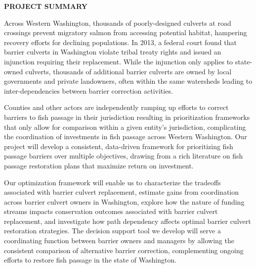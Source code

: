 \begin{center} \textbf{PROJECT SUMMARY} \end{center}




			Across Western Washington, thousands of poorly-designed culverts at road crossings prevent migratory salmon from accessing potential habitat, hampering recovery efforts for declining populations. In 2013, a federal court found that barrier culverts in Washington violate tribal treaty rights and issued an injunction requiring their replacement. While the injunction only applies to state-owned culverts, thousands of additional barrier culverts are owned by local governments and private landowners, often within the same watersheds leading to inter-dependencies between barrier correction activities. 
			
			Counties and other actors are independently ramping up efforts to correct barriers to fish passage in their jurisdiction resulting in prioritization frameworks that only allow for comparison within a given entity's jurisdiction, complicating the coordination of investments in fish passage across Western Washington. Our project will develop a consistent, data-driven framework for prioritizing fish passage barriers over multiple objectives, drawing from a rich literature on fish passage restoration plans that maximize return on investment. 
			
			Our optimization framework will enable us to characterize the tradeoffs associated with barrier culvert replacement, estimate gains from coordination across barrier culvert owners in Washington, explore how the nature of funding streams impacts conservation outcomes associated with barrier culvert replacement, and investigate how path dependency affects optimal barrier culvert restoration strategies. The decision support tool we develop will serve a coordinating function between barrier owners and managers by allowing the consistent comparison of alternative barrier correction, complementing ongoing efforts to restore fish passage in the state of Washington.
